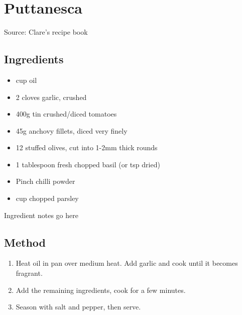 \section{Puttanesca}


Source: Clare's recipe book

\subsection{Ingredients}

\begin{itemize}
    \item {} cup oil
    \item 2 cloves garlic, crushed
    \item 400g tin crushed/diced tomatoes
    \item 45g anchovy fillets, diced very finely
    \item 12 stuffed olives, cut into 1-2mm thick rounds
    \item 1 tablespoon fresh chopped basil (or  tsp dried)
    \item Pinch chilli powder
    \item {} cup chopped parsley
\end{itemize}

Ingredient notes go here

\subsection{Method}

\begin{enumerate}
    \item Heat oil in pan over medium heat. Add garlic and cook until it becomes fragrant.
    \item Add the remaining ingredients, cook for a few minutes.
    \item Season with salt and pepper, then serve.
\end{enumerate}
